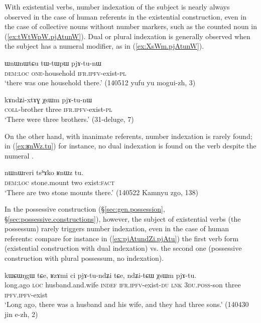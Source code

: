 With existential verbs, number indexation of the subject is nearly always observed in the case of human referents in the existential construction, even in the case of collective nouns without number markers, such as the counted noun  in (\ref{ex:tWtWpW.pjAtunW}). Dual or plural indexation is generally observed when the subject has a numeral modifier, as in (\ref{ex:XsWm.pjAtunW}). 


\begin{exe}
\ex \label{ex:tWtWpW.pjAtunW}
\gll  ɯnɯnɯtɕu tɯ-tɯpɯ pjɤ-tu-nɯ \\
\textsc{dem}:\textsc{loc} \textsc{one}-household \textsc{ifr}.\textsc{ipfv}-exist-\textsc{pl} \\
\glt `there was one household there.' (140512 yufu yu mogui-zh, 3)
\end{exe}

\begin{exe}
\ex \label{ex:XsWm.pjAtunW}
\gll kɤndʑi-xtɤɣ χsɯm pjɤ-tu-nɯ \\
\textsc{coll}-brother three \textsc{ifr}.\textsc{ipfv}-exist-\textsc{pl} \\
\glt `There were three brothers.' (31-deluge, 7)
\end{exe}

On the other hand, with inanimate referents, number indexation is rarely found; in (\ref{ex:ʁnWz.tu}) for instance, no dual indexation is found on the verb despite the numeral .

\begin{exe}
\ex \label{ex:ʁnWz.tu}
\gll  nɯnɯreri tsʰɤko ʁnɯz tu. \\
\textsc{dem}:\textsc{loc} stone.mount two exist:\textsc{fact} \\
\glt `There are two stone mounts there.' (140522 Kamnyu zgo, 138)
\end{exe}

In the possessive construction (§\ref{sec:gen.possession}, §\ref{sec:possessive.constructions}), however, the subject of existential verbs (the possessum) rarely triggers number indexation, even in the case of human referents: compare for instance in (\ref{ex:pjAtundZi.pjAtu}) the first verb form  (existential construction with dual indexation) vs. the second one  (possessive construction with plural possessum, no indexation).

\begin{exe}
\ex \label{ex:pjAtundZi.pjAtu}
\gll kɯɕɯŋgɯ tɕe, ʁzɤmi ci pjɤ-tu-ndʑi tɕe, ndʑi-tɕɯ χsɯm pjɤ-tu. \\
long.ago \textsc{loc} husband.and.wife \textsc{indef} \textsc{ifr}.\textsc{ipfv}-exist-\textsc{du} \textsc{lnk} \textsc{3du}.\textsc{poss}-son three \textsc{ipfv}.\textsc{ipfv}-exist \\
\glt `Long ago, there was a husband and his wife, and they had three sons.' (140430 jin e-zh, 2)
\end{exe}

